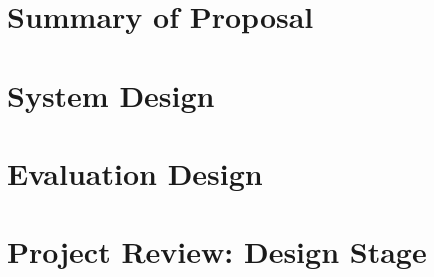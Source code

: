 \section{Summary of Proposal} \label{desProSum}

\section{System Design} \label{desSys}

\section{Evaluation Design} \label{desEval}

\section{Project Review: Design Stage} \label{desReview}

